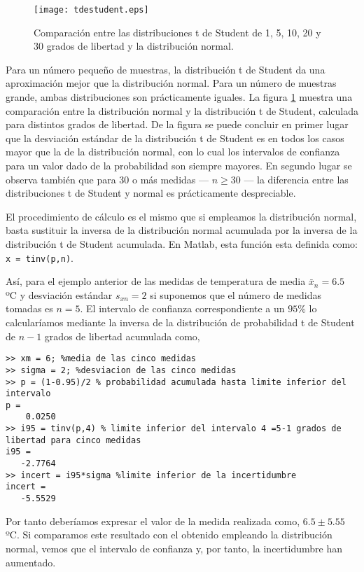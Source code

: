 \begin{figure}[h]
\centering
\texttt{[image: tdestudent.eps]}
\caption{Comparación entre las distribuciones t de Student de 1, 5, 10, 20 y 30 grados de libertad y la distribución normal.}
\label{fig:tdst}
\end{figure}

Para un número pequeño de muestras, la distribución t de Student da una aproximación mejor que la distribución normal. Para un número de muestras grande, ambas distribuciones son prácticamente iguales.  La figura \ref{fig:tdst} muestra una comparación entre la distribución normal y la distribución t de Student, calculada para distintos grados de libertad. De la figura se puede concluir en primer lugar que la desviación estándar de la distribución t de Student es en todos los casos mayor que la de la distribución normal, con lo cual los intervalos de confianza para un valor dado de la probabilidad son siempre mayores. En segundo lugar se observa también que para 30 o más medidas --- $n\geqslant 30$ --- la diferencia entre las distribuciones t de Student y normal es prácticamente despreciable.

El procedimiento de cálculo es el mismo que si empleamos la distribución normal, basta sustituir la inversa de la distribución normal acumulada por la inversa de la distribución t de Student acumulada. En Matlab, esta función esta definida como: \texttt{x = tinv(p,n)}. 

Así, para el ejemplo anterior de las medidas de temperatura de media  $\bar{x}_n=6.5$ ºC y  desviación estándar $s_{xn}=2$  si suponemos que el número de medidas tomadas es $n=5$. El intervalo de confianza correspondiente a un $95\%$  lo calcularíamos mediante la inversa de la distribución de probabilidad t de Student de $n-1$ grados de libertad acumulada como,

\begin{verbatim}
>> xm = 6; %media de las cinco medidas
>> sigma = 2; %desviacion de las cinco medidas
>> p = (1-0.95)/2 % probabilidad acumulada hasta limite inferior del intervalo
p =
    0.0250
>> i95 = tinv(p,4) % limite inferior del intervalo 4 =5-1 grados de libertad para cinco medidas
i95 =
   -2.7764
>> incert = i95*sigma %limite inferior de la incertidumbre
incert =
   -5.5529
\end{verbatim}

Por tanto deberíamos expresar el valor de la medida realizada como, $6.5\pm 5.55$ ºC. Si comparamos este resultado con el obtenido empleando la distribución normal, vemos que el intervalo de confianza y, por tanto, la incertidumbre han aumentado.

